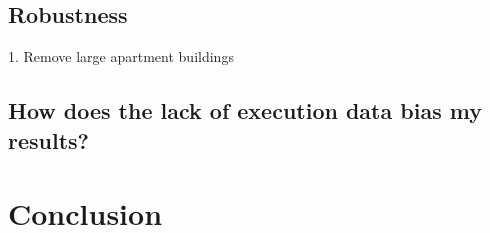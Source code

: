 \documentclass[12pt]{article}
\begin{document}
    \subsection{Robustness}
    1. Remove large apartment buildings

    
    \subsection{How does the lack of execution data bias my results?}

    


\section{Conclusion} \label{sec:conclusion}





\clearpage

\onehalfspacing

%
\end{document}

